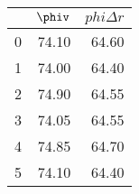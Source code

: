 \begin{tabular}{lrr}
\toprule
{} &  $\phiv$ &  $phi\Delta r$ \\
\midrule
0 &    74.10 &          64.60 \\
1 &    74.00 &          64.40 \\
2 &    74.90 &          64.55 \\
3 &    74.05 &          64.55 \\
4 &    74.85 &          64.70 \\
5 &    74.10 &          64.40 \\
\bottomrule
\end{tabular}
